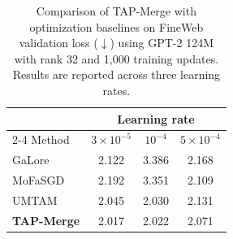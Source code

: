 \begin{table}[t]
\centering\small
\caption{Comparison of TAP-Merge with optimization baselines
on FineWeb validation loss ($\downarrow$) using GPT-2 124M
with rank 32 and 1,000 training updates. Results are reported
across three learning rates.}
\label{tab:fineweb_lr}
\begin{tabular}{lccc}
\toprule
 & \multicolumn{3}{c}{Learning rate}\\
\cmidrule(lr){2-4}
Method & $3\times10^{-5}$ & $10^{-4}$ & $5\times10^{-4}$\\
\midrule
GaLore~\cite{galore2024} & 2.122 & 3.386 & 2.168\\
MoFaSGD~\cite{mofasgd2025} & 2.192 & 3.351 & 2.109\\
UMTAM~\cite{umtam2026} & 2.045 & 2.030 & 2.131\\
\midrule
\textbf{TAP-Merge} & 2.017 & 2.022 & 2.071\\ \bottomrule
\end{tabular}
\end{table}
